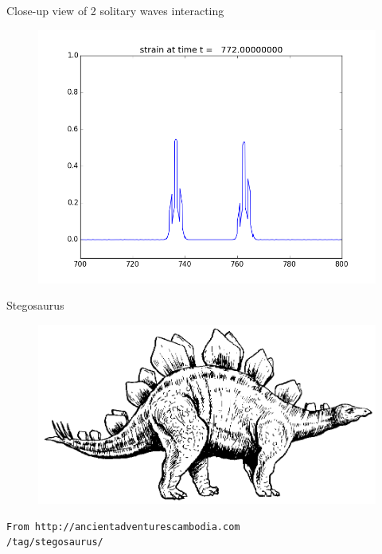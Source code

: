 \documentclass{beamer}
\begin{document}
\begin{frame}{Close-up view of 2 solitary waves interacting}
\begin{figure}
  \includegraphics[height=0.6\linewidth]{collision.png}
\end{figure}
\end{frame}

\begin{frame}[fragile]{Stegosaurus}
\begin{figure}
  \centering
  \includegraphics[width=\textwidth]{stegosaurus.png}\\
\end{figure}
\begin{verbatim}
From http://ancientadventurescambodia.com
/tag/stegosaurus/
\end{verbatim}
\end{frame}
\end{document}

